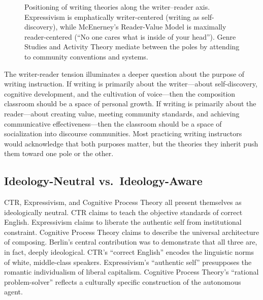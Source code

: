 \documentclass[12pt]{article}
\begin{document}
\begin{figure}[H]
\caption{Positioning of writing theories along the writer--reader axis. Expressivism is emphatically writer-centered (writing as self-discovery), while McEnerney's Reader-Value Model is maximally reader-centered (``No one cares what is inside of your head''). Genre Studies and Activity Theory mediate between the poles by attending to community conventions and systems.}
\label{fig:writer-reader}
\end{figure}

The writer-reader tension illuminates a deeper question about the purpose of writing instruction. If writing is primarily about the writer---about self-discovery, cognitive development, and the cultivation of voice---then the composition classroom should be a space of personal growth. If writing is primarily about the reader---about creating value, meeting community standards, and achieving communicative effectiveness---then the classroom should be a space of socialization into discourse communities. Most practicing writing instructors would acknowledge that both purposes matter, but the theories they inherit push them toward one pole or the other.

\subsection{Ideology-Neutral vs.\ Ideology-Aware}

CTR, Expressivism, and Cognitive Process Theory all present themselves as ideologically neutral. CTR claims to teach the objective standards of correct English. Expressivism claims to liberate the authentic self from institutional constraint. Cognitive Process Theory claims to describe the universal architecture of composing. Berlin's central contribution was to demonstrate that all three are, in fact, deeply ideological. CTR's ``correct English'' encodes the linguistic norms of white, middle-class speakers. Expressivism's ``authentic self'' presupposes the romantic individualism of liberal capitalism. Cognitive Process Theory's ``rational problem-solver'' reflects a culturally specific construction of the autonomous agent.
\end{document}
